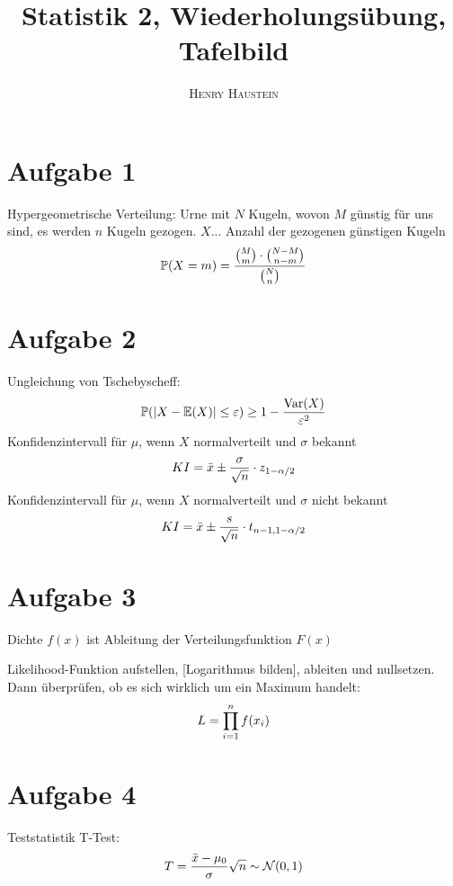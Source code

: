 \documentclass{article}
\title{\textbf{Statistik 2, Wiederholungsübung, Tafelbild}}
\author{\textsc{Henry Haustein}}
\date{}
\DeclareMathOperator{\Var}{Var}
\newcommand{\E}{\mathbb{E}}
\begin{document}
	\maketitle
	
	\section*{Aufgabe 1}
	Hypergeometrische Verteilung: Urne mit $N$ Kugeln, wovon $M$ günstig für uns sind, es werden $n$ Kugeln gezogen. $X$... Anzahl der gezogenen günstigen Kugeln
	\begin{align}
		\mathbb{P}(X=m) = \frac{\binom{M}{m}\cdot\binom{N-M}{n-m}}{\binom{N}{n}} \notag
	\end{align}
	
	\section*{Aufgabe 2}
	Ungleichung von Tschebyscheff:
	\begin{align}
		\mathbb{P}(\vert X-\E(X)\vert \le \varepsilon) \ge 1- \frac{\Var(X)}{\varepsilon^2} \notag
	\end{align}
	Konfidenzintervall für $\mu$, wenn $X$ normalverteilt und $\sigma$ bekannt
	\begin{align}
		KI = \bar{x} \pm \frac{\sigma}{\sqrt{n}}\cdot z_{1-\alpha/2} \notag
	\end{align}
	Konfidenzintervall für $\mu$, wenn $X$ normalverteilt und $\sigma$ nicht bekannt
	\begin{align}
		KI = \bar{x} \pm \frac{s}{\sqrt{n}}\cdot t_{n-1,1-\alpha/2} \notag
	\end{align}
	
	\section*{Aufgabe 3}
	Dichte $f(x)$ ist Ableitung der Verteilungsfunktion $F(x)$
	
	Likelihood-Funktion aufstellen, [Logarithmus bilden], ableiten und nullsetzen. Dann überprüfen, ob es sich wirklich um ein Maximum handelt:
	\begin{align}
		L = \prod_{i=1}^n f(x_i) \notag 
	\end{align}

	\section*{Aufgabe 4}
	Teststatistik T-Test:
	\begin{align}
		T = \frac{\bar{x} - \mu_0}{\sigma}\sqrt{n} \sim \mathcal{N}(0,1) \notag
	\end{align}
\end{document}
